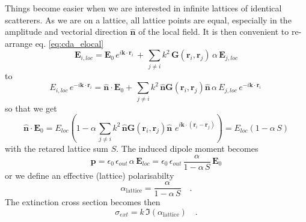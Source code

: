 Things become easier when we are interested in infinite lattices of identical scatterers. As we are on a lattice, all lattice points are equal, especially in the amplitude and vectorial direction $\mathbf{\hat{n}}$ of the local field. It is then 
 convenient to re-arrange eq. \ref{eq:cda_elocal}
\begin{equation}
\mathbf{E}_{i, loc} =\mathbf{E}_{0} \, e^{i \mathbf{k} \cdot \mathbf{r}_i} \, +  \, 
 \sum_{j \neq i} k^2 \, 
\mathbf{G}(\mathbf{r}_i, \mathbf{r}_j) \,    \alpha \, \mathbf{E}_{j,loc}
\end{equation}
to
\begin{equation}
E_{i, loc}  \, e^{-i \mathbf{k} \cdot \mathbf{r}_i} =\mathbf{\hat{n}} \cdot \mathbf{E}_{0}  +  \, 
 \sum_{j \neq i} k^2 \, 
 \mathbf{\hat{n}} \mathbf{G}(\mathbf{r}_i, \mathbf{r}_j)  \mathbf{\hat{n}}\,    \alpha \, E_{j,loc} \, e^{-i \mathbf{k} \cdot \mathbf{r}_i} \,
\end{equation}
so that we get
\begin{equation}
\mathbf{\hat{n}} \cdot \mathbf{E}_{0} = 
E_{loc} \left( 1 -     \alpha  \,
 \sum_{j \neq i} k^2 \, 
 \mathbf{\hat{n}} \mathbf{G}(\mathbf{r}_i, \mathbf{r}_j)  \mathbf{\hat{n}}\,     \, e^{i \mathbf{k} \cdot ( \mathbf{r}_i - \mathbf{r}_j  ) } \right)
 = 
 {E}_{loc} \left( 1 -     \alpha  \, S \right)
\end{equation}
with the retared lattice sum $S$. The induced
dipole moment becomes 
\begin{equation}
\mathbf{p} = \epsilon_0 \, \epsilon_{out} \, \alpha \, \mathbf{E}_{loc} =  \epsilon_0 \, \epsilon_{out} \, \frac{\alpha}{ 1 -     \alpha  \, S } \,
  \mathbf{E}_{0} 
\end{equation} 
or  we define an effective (lattice) polarisabilty
\begin{equation}
\alpha_\text{lattice} = \frac{\alpha}{ 1 -     \alpha  \, S }  \quad .
\end{equation} 
The extinction cross section becomes then
\begin{equation}
\sigma_{ext} = k \, \Im(\alpha_\text{lattice})  \quad .
\end{equation}



\printbibliography[segment=\therefsegment,heading=subbibliography]




